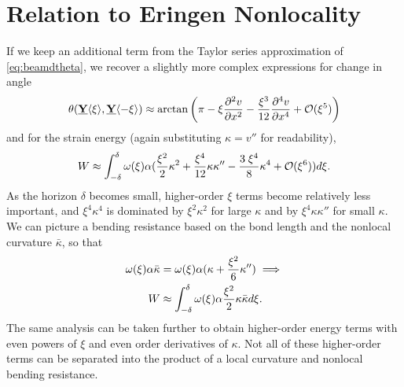 \documentclass[11pt]{amsart}
\newcommand\vstate[3]{%
	\mathbf{\underline{#1}}%
	\ifstrempty{#2}{}{[#2]}%
	\ifstrempty{#3}{}{\langle #3 \rangle}}
\begin{document}
\section{Relation to Eringen Nonlocality}
\label{sec:EringenCompare}
If we keep an additional term from the Taylor series approximation of \cref{eq:beamdtheta}, we recover a slightly more complex expressions for change in angle
%
\begin{equation}
\label{eq:beamdthetaHOT}
\theta(\vstate{Y}{}{\xi},\vstate{Y}{}{\mathbf{-\xi}}) \approx \arctan\left(\pi-\xi \frac{\partial^2 v}{\partial x^2} -\frac{\xi^3}{12} \frac{\partial^4 v}{\partial x^4}  +\mathcal{O}(\xi^5)\right)\notag
\end{equation}
%
and for the strain energy (again substituting \(\kappa = v''\) for readability),
%
%
%
\begin{equation}
W \approx \int_{-\delta}^\delta \omega(\xi)\alpha(\frac{\xi^2}{2}\kappa^2+\frac{\xi^4}{12}\kappa\kappa''-\frac{3\; \xi^4}{8}\kappa^4+\mathcal{O}(\xi^6)) d\xi .\notag
\end{equation}
%
As the horizon \(\delta\) becomes small, higher-order \(\xi\) terms become relatively less important, and \(\xi^4\kappa^4\) is dominated by \(\xi^2\kappa^2\) for large \(\kappa\) and by \(\xi^4\kappa\kappa''\) for small \(\kappa\).
We can picture a bending resistance based on the bond length and the nonlocal curvature  \(\bar{\kappa}\), so that 
%
\begin{align}
\label{eq:NLbending}
 \omega(\xi)\alpha\bar{\kappa}&=  \omega(\xi)\alpha(\kappa + \frac{\xi^2}{6}\kappa'') \implies  \\
W &\approx \int_{-\delta}^\delta \omega(\xi)\alpha \frac{\xi^2}{2}\kappa\bar{\kappa}d\xi .\notag
\end{align}
%  
The same analysis can be taken further to obtain higher-order energy terms with even powers of \(\xi\) and even order derivatives of \(\kappa\). 
Not all of these higher-order terms can be separated into the product of a local curvature and nonlocal bending resistance.
\end{document}

